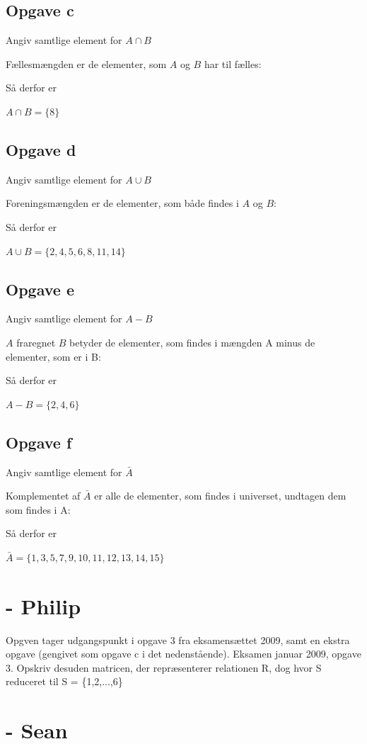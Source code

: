 \documentclass{article}
\begin{document}
\subsection*{Opgave c}
Angiv samtlige element for $A \cap B$

Fællesmængden er de elementer, som $A$ og $B$ har til fælles:

Så derfor er

\begin{center}
$A \cap B = \{ 8 \}$  
\end{center}

\subsection*{Opgave d}
Angiv samtlige element for $A \cup B$

Foreningsmængden er de elementer, som både findes i $A$ og $B$:

Så derfor er

\begin{center}
$A \cup B = \{ 2, 4, 5, 6, 8, 11, 14 \}$  
\end{center}

\subsection*{Opgave e}
Angiv samtlige element for $A - B$

$A$ fraregnet $B$ betyder de elementer, som findes i mængden A minus de elementer, som er i B:

Så derfor er

\begin{center}
$A - B = \{ 2, 4, 6 \}$  
\end{center}

\subsection*{Opgave f}
Angiv samtlige element for $\bar{A}$

Komplementet af $\bar{A}$ er alle de elementer, som findes i universet, undtagen dem som findes i A:

Så derfor er

\begin{center}
$\bar{A} = \{ 1, 3, 5, 7, 9, 10, 11, 12, 13, 14, 15 \}$  
\end{center}

\section{- Philip}
Opgven tager udgangspunkt i opgave 3 fra eksamensættet 2009, samt en ekstra opgave (gengivet som opgave c i det nedenstående).
Eksamen januar 2009, opgave 3. Opskriv desuden matricen, der repræsenterer relationen R, dog hvor S reduceret til S = \{1,2,...,6\} 



\section{- Sean}
\end{document}
